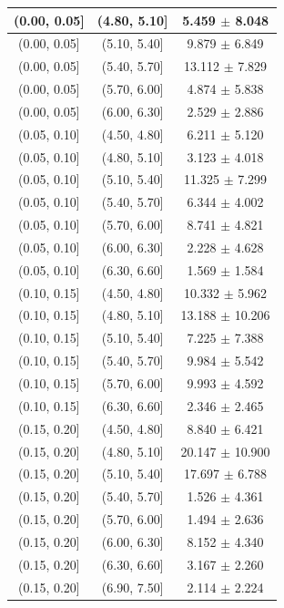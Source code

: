 \begin{longtable}{|c|c|c|}
\hline
\endlastfoot
(0.00, 0.05] & (4.80, 5.10] & 5.459 $\pm$ 8.048 \\ 
\hline
(0.00, 0.05] & (5.10, 5.40] & 9.879 $\pm$ 6.849 \\ 
\hline
(0.00, 0.05] & (5.40, 5.70] & 13.112 $\pm$ 7.829 \\ 
\hline
(0.00, 0.05] & (5.70, 6.00] & 4.874 $\pm$ 5.838 \\ 
\hline
(0.00, 0.05] & (6.00, 6.30] & 2.529 $\pm$ 2.886 \\ 
\hline
(0.05, 0.10] & (4.50, 4.80] & 6.211 $\pm$ 5.120 \\ 
\hline
(0.05, 0.10] & (4.80, 5.10] & 3.123 $\pm$ 4.018 \\ 
\hline
(0.05, 0.10] & (5.10, 5.40] & 11.325 $\pm$ 7.299 \\ 
\hline
(0.05, 0.10] & (5.40, 5.70] & 6.344 $\pm$ 4.002 \\ 
\hline
(0.05, 0.10] & (5.70, 6.00] & 8.741 $\pm$ 4.821 \\ 
\hline
(0.05, 0.10] & (6.00, 6.30] & 2.228 $\pm$ 4.628 \\ 
\hline
(0.05, 0.10] & (6.30, 6.60] & 1.569 $\pm$ 1.584 \\ 
\hline
(0.10, 0.15] & (4.50, 4.80] & 10.332 $\pm$ 5.962 \\ 
\hline
(0.10, 0.15] & (4.80, 5.10] & 13.188 $\pm$ 10.206 \\ 
\hline
(0.10, 0.15] & (5.10, 5.40] & 7.225 $\pm$ 7.388 \\ 
\hline
(0.10, 0.15] & (5.40, 5.70] & 9.984 $\pm$ 5.542 \\ 
\hline
(0.10, 0.15] & (5.70, 6.00] & 9.993 $\pm$ 4.592 \\ 
\hline
(0.10, 0.15] & (6.30, 6.60] & 2.346 $\pm$ 2.465 \\ 
\hline
(0.15, 0.20] & (4.50, 4.80] & 8.840 $\pm$ 6.421 \\ 
\hline
(0.15, 0.20] & (4.80, 5.10] & 20.147 $\pm$ 10.900 \\ 
\hline
(0.15, 0.20] & (5.10, 5.40] & 17.697 $\pm$ 6.788 \\ 
\hline
(0.15, 0.20] & (5.40, 5.70] & 1.526 $\pm$ 4.361 \\ 
\hline
(0.15, 0.20] & (5.70, 6.00] & 1.494 $\pm$ 2.636 \\ 
\hline
(0.15, 0.20] & (6.00, 6.30] & 8.152 $\pm$ 4.340 \\ 
\hline
(0.15, 0.20] & (6.30, 6.60] & 3.167 $\pm$ 2.260 \\ 
\hline
(0.15, 0.20] & (6.90, 7.50] & 2.114 $\pm$ 2.224 \\ 
\hline

\end{longtable}
